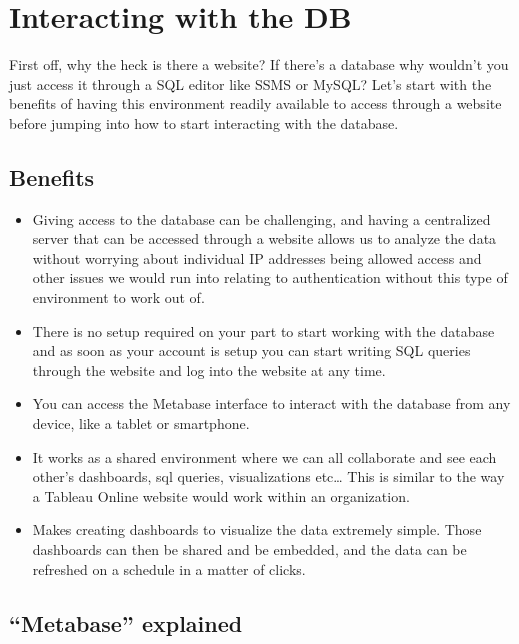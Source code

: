 \documentclass[]{book}
\begin{document}
\hypertarget{interacting-with-the-db}{%
\chapter{Interacting with the DB}\label{interacting-with-the-db}}

First off, why the heck is there a website? If there's a database why wouldn't you just access it through a SQL editor like SSMS or MySQL? Let's start with the benefits of having this environment readily available to access through a website before jumping into how to start interacting with the database.

\hypertarget{benefits}{%
\section{Benefits}\label{benefits}}

\begin{itemize}
\item
  Giving access to the database can be challenging, and having a centralized server that can be accessed through a website allows us to analyze the data without worrying about individual IP addresses being allowed access and other issues we would run into relating to authentication without this type of environment to work out of.
\item
  There is no setup required on your part to start working with the database and as soon as your account is setup you can start writing SQL queries through the website and log into the website at any time.
\item
  You can access the Metabase interface to interact with the database from any device, like a tablet or smartphone.
\item
  It works as a shared environment where we can all collaborate and see each other's dashboards, sql queries, visualizations etc\ldots{} This is similar to the way a Tableau Online website would work within an organization.
\item
  Makes creating dashboards to visualize the data extremely simple. Those dashboards can then be shared and be embedded, and the data can be refreshed on a schedule in a matter of clicks.
\end{itemize}

\hypertarget{metabase-explained}{%
\section{``Metabase'' explained}\label{metabase-explained}}
\end{document}
